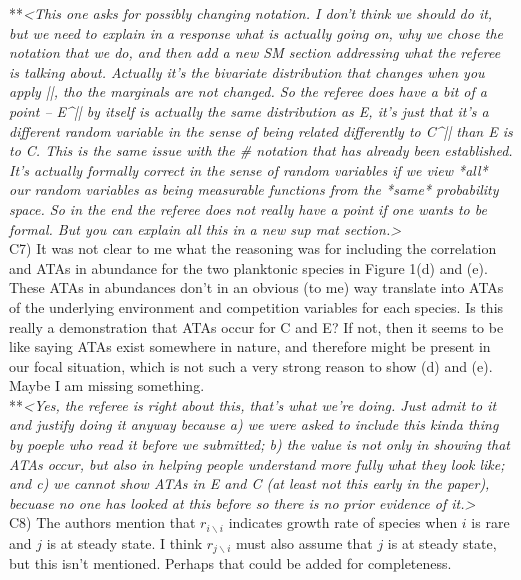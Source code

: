 \documentclass[letterpaper,11pt]{article}
\newcommand{\bs}{\backslash}
\begin{document}
\noindent ***\emph{<This one asks for possibly changing notation. I don’t think we should do it, but we need to explain in a response what is actually going on, why we chose the notation that we do, and then add a new SM section addressing what the referee is talking about. Actually it’s the bivariate distribution that changes when you apply ||, tho the marginals are not changed. So the referee does have a bit of a point – E^{||} by itself is actually the same distribution as E, it’s just that it’s a different random variable in the sense of being related differently to C^{||} than E is to C. This is the same issue with the # notation that has already been established. It’s actually formally correct in the sense of random variables if we view *all* our random variables as being measurable functions from the *same* probability space. So in the end the referee does not really have a point if one wants to be formal. But you can explain all this in a new sup mat section.>} \\

\noindent C7) It was not clear to me what the reasoning was for including the correlation and ATAs in abundance for the two planktonic species in Figure 1(d) and (e).  These ATAs in abundances don't in an obvious (to me) way translate into ATAs of the underlying environment and competition variables for each species. Is this really a demonstration that ATAs occur for C and E?  If not, then it seems to be like saying ATAs exist somewhere in nature, and therefore might be present in our focal situation, which is not such a very strong reason to show (d) and (e).  Maybe I am missing something. \\

\noindent ***\emph{<Yes, the referee is right about this, that's what we're doing. Just admit to it and justify doing it anyway because a) we were asked to include this kinda thing by poeple who read it before we submitted; b) the value is not only in showing that ATAs occur, but also in helping people understand more fully what they look like; and c) we cannot show ATAs in E and C (at least not this early in the paper), becuase no one has looked at this before so there is no prior evidence of it.>} \\

\noindent C8) The authors mention that $r_{i \bs i}$ indicates growth rate of species when $i$ is rare and $j$ is at steady state.  I think $r_{j \bs i}$ must also assume that $j$ is at steady state, but this isn't mentioned. Perhaps that could be added for completeness. \\
\end{document}
